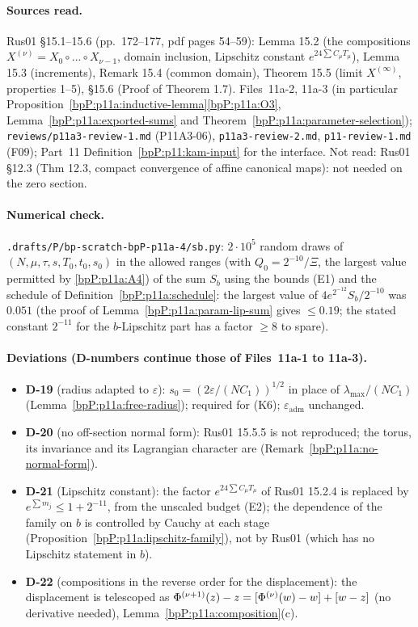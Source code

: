 \paragraph{Sources read.} Rus01 \S15.1--15.6 (pp.~172--177, pdf pages 54--59): Lemma 15.2 (the compositions $X^{(\nu)}=X_0\circ\dots\circ X_{\nu-1}$, domain inclusion, Lipschitz constant $e^{24\sum C_\mu T_\mu}$), Lemma 15.3 (increments), Remark 15.4 (common domain), Theorem 15.5 (limit $X^{(\infty)}$, properties 1--5), \S15.6 (Proof of Theorem 1.7). Files~11a-2, 11a-3 (in particular Proposition~\ref{bpP:p11a:inductive-lemma}\ref{bpP:p11a:O3}, Lemma~\ref{bpP:p11a:exported-sums} and Theorem~\ref{bpP:p11a:parameter-selection}); \texttt{reviews/p11a3-review-1.md} (P11A3-06), \texttt{p11a3-review-2.md}, \texttt{p11-review-1.md} (F09); Part~11 Definition~\ref{bpP:p11:kam-input} for the interface. Not read: Rus01 \S12.3 (Thm 12.3, compact convergence of affine canonical maps): not needed on the zero section.

\paragraph{Numerical check.} \texttt{.drafts/P/bp-scratch-bpP-p11a-4/sb.py}: $2\cdot10^5$ random draws of $(N,\mu,\tau,s,T_0,t_0,s_0)$ in the allowed ranges (with $Q_0=2^{-10}/\Xi$, the largest value permitted by \ref{bpP:p11a:A4}) of the sum $S_b$ using the bounds (E1) and the schedule of Definition~\ref{bpP:p11a:schedule}: the largest value of $4e^{2^{-12}}S_b/2^{-10}$ was $0.051$ (the proof of Lemma~\ref{bpP:p11a:param-lip-sum} gives $\le0.19$; the stated constant $2^{-11}$ for the $b$-Lipschitz part has a factor $\ge8$ to spare).

\paragraph{Deviations (D-numbers continue those of Files~11a-1 to 11a-3).}
\begin{itemize}
\item \textbf{D-19} (radius adapted to $\varepsilon$): $s_0=(2\varepsilon/(NC_1))^{1/2}$ in place of $\lambda_{\max}/(NC_1)$ (Lemma~\ref{bpP:p11a:free-radius}); required for (K6); $\varepsilon_{\mathrm{adm}}$ unchanged.
\item \textbf{D-20} (no off-section normal form): Rus01 15.5.5 is not reproduced; the torus, its invariance and its Lagrangian character are (Remark~\ref{bpP:p11a:no-normal-form}).
\item \textbf{D-21} (Lipschitz constant): the factor $e^{24\sum C_\mu T_\mu}$ of Rus01 15.2.4 is replaced by $e^{\sum m_j}\le1+2^{-11}$, from the unscaled budget (E2); the dependence of the family on $b$ is controlled by Cauchy at each stage (Proposition~\ref{bpP:p11a:lipschitz-family}), not by Rus01 (which has no Lipschitz statement in $b$).
\item \textbf{D-22} (compositions in the reverse order for the displacement): the displacement is telescoped as $\Phi^{(\nu+1)}(z)-z=[\Phi^{(\nu)}(w)-w]+[w-z]$ (no derivative needed), Lemma~\ref{bpP:p11a:composition}(c).
\end{itemize}

